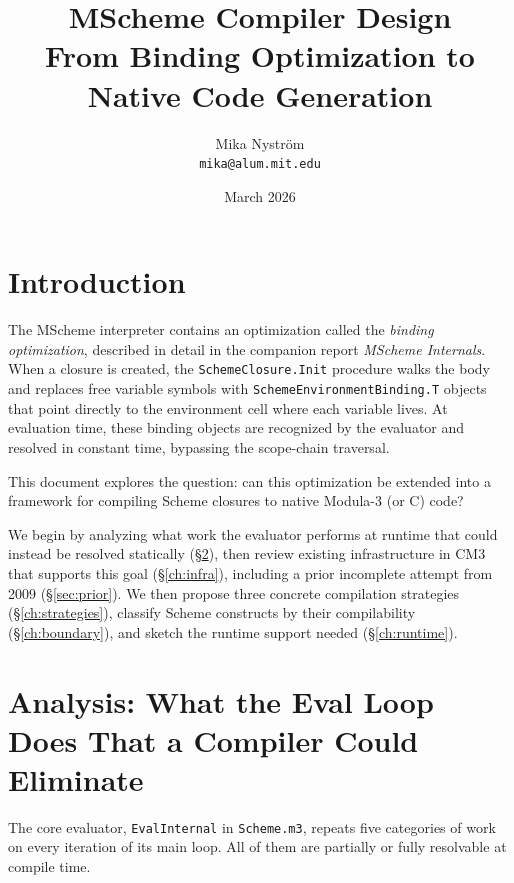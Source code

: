 \documentclass[12pt]{report}
\title{\bfseries\sffamily\fontsize{24.88}{30}\selectfont
  MScheme Compiler Design\\[0.5em]
  \large From Binding Optimization to Native Code Generation}
\author{Mika Nystr\"om \\ {\tt mika@alum.mit.edu}}
\date{March 2026}
\begin{document}
\maketitle
\thispagestyle{empty}

\newpage
\tableofcontents
\newpage

\chapter{Introduction}

The MScheme interpreter contains an optimization called the
\emph{binding optimization}, described in detail in the companion
report \emph{MScheme Internals}.  When a closure is created, the
\texttt{SchemeClosure.Init} procedure walks the body and replaces
free variable symbols with \texttt{SchemeEnvironmentBinding.T}
objects that point directly to the environment cell where each
variable lives.  At evaluation time, these binding objects are
recognized by the evaluator and resolved in constant time, bypassing
the scope-chain traversal.

This document explores the question: can this optimization be
extended into a framework for compiling Scheme closures to native
Modula-3 (or C) code?

We begin by analyzing what work the evaluator performs at runtime
that could instead be resolved statically (\S\ref{ch:analysis}),
then review existing infrastructure in CM3 that supports this goal
(\S\ref{ch:infra}), including a prior incomplete attempt from 2009
(\S\ref{sec:prior}).  We then propose three concrete compilation
strategies (\S\ref{ch:strategies}), classify Scheme constructs by
their compilability (\S\ref{ch:boundary}), and sketch the runtime
support needed (\S\ref{ch:runtime}).

\chapter{Analysis: What the Eval Loop Does That a Compiler Could Eliminate}
\label{ch:analysis}

The core evaluator, \texttt{EvalInternal} in \texttt{Scheme.m3},
repeats five categories of work on every iteration of its main loop.
All of them are partially or fully resolvable at compile time.
\end{document}

